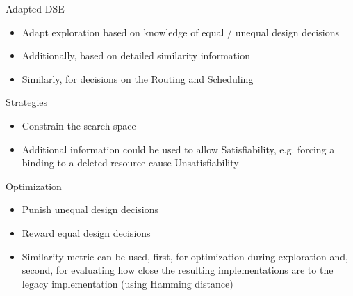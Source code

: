 \documentclass[11pt]{beamer}
\begin{document}
\begin{frame}{Adapted DSE}
	\begin{itemize}
		\item Adapt exploration based on knowledge of equal / unequal design decisions
		{\tiny}
		\pause
		\item Additionally, based on detailed similarity information
		{\tiny}
		\pause
		\item Similarly, for decisions on the Routing and Scheduling
	\end{itemize}
\end{frame}

\begin{frame}{Strategies}
	\begin{itemize}
		\item Constrain the search space
		{\small}
		\pause
		\item Additional information could be used to allow Satisfiability, e.g. forcing a binding to a deleted resource cause Unsatisfiability
		{\small}
	\end{itemize}
\end{frame}

\begin{frame}{Optimization}
	\begin{itemize}
		\item Punish unequal design decisions
		{\footnotesize}
		\item Reward equal design decisions
		{\footnotesize}
		\pause
		\item Similarity metric can be used, first, for optimization during exploration and, second, for evaluating how close the resulting implementations are to the legacy implementation (using Hamming distance)
	\end{itemize}
\end{frame}
\end{document}
